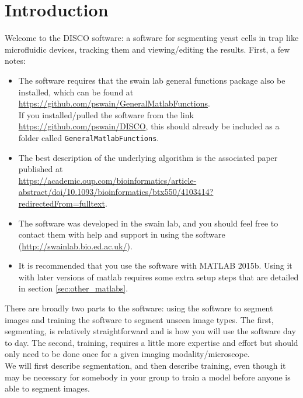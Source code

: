 \section{Introduction}
\label{sec:intro}
 
 Welcome to the DISCO software: a software for segmenting yeast cells in trap like microfluidic devices, tracking them and viewing/editing the results. First, a few notes:
 \begin{itemize}
 	\item The software requires that the swain lab general functions package also be installed, which can be found at \href{https://github.com/pswain/GeneralMatlabFunctions}{https://github.com/pswain/GeneralMatlabFunctions}. \\
 	If you installed/pulled the software from the link \href{https://github.com/pswain/DISCO}{https://github.com/pswain/DISCO}, this should already be included as a folder called \texttt{GeneralMatlabFunctions}.
 	\item The best description of the underlying algorithm is the associated paper published at\\ \href{https://academic.oup.com/bioinformatics/article-abstract/doi/10.1093/bioinformatics/btx550/4103414?redirectedFrom=fulltext}{https://academic.oup.com/bioinformatics/article-abstract/doi/10.1093/bioinformatics/btx550/4103414?redirectedFrom=fulltext}.
 	\item The software was developed in the swain lab, and you should feel free to contact them with help and support in using the software (\href{http://swainlab.bio.ed.ac.uk/}{http://swainlab.bio.ed.ac.uk/}).
 	\item It is recommended that you use the software with MATLAB 2015b. Using it with later versions of matlab requires some extra setup steps that are detailed in section \ref{sec:other_matlabs}.
 \end{itemize}
 
 There are broadly two parts to the software: using the software to segment images and training the software to segment unseen image types. The first, segmenting, is relatively straightforward and is how you will use the software day to day. The second, training, requires a little more expertise and effort but should only need to be done once for a given imaging modality/microscope. \\
 We will first describe segmentation, and then describe training, even though it may be necessary for somebody in your group to train a model before anyone is able to segment images.